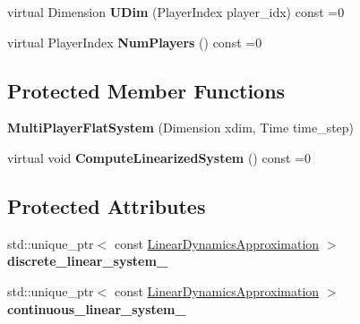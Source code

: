 \begin{DoxyCompactItemize}
\item 
virtual Dimension {\bfseries U\+Dim} (Player\+Index player\+\_\+idx) const =0\hypertarget{classilqgames_1_1_multi_player_flat_system_a1cb3a0636263a35dd2b10f8b203bf29b}{}\label{classilqgames_1_1_multi_player_flat_system_a1cb3a0636263a35dd2b10f8b203bf29b}

\item 
virtual Player\+Index {\bfseries Num\+Players} () const =0\hypertarget{classilqgames_1_1_multi_player_flat_system_a5732cac3a3a64567a3d1b460d787a52d}{}\label{classilqgames_1_1_multi_player_flat_system_a5732cac3a3a64567a3d1b460d787a52d}

\end{DoxyCompactItemize}
\subsection*{Protected Member Functions}
\begin{DoxyCompactItemize}
\item 
{\bfseries Multi\+Player\+Flat\+System} (Dimension xdim, Time time\+\_\+step)\hypertarget{classilqgames_1_1_multi_player_flat_system_a73df802233de8b218744e662ab250b59}{}\label{classilqgames_1_1_multi_player_flat_system_a73df802233de8b218744e662ab250b59}

\item 
virtual void {\bfseries Compute\+Linearized\+System} () const =0\hypertarget{classilqgames_1_1_multi_player_flat_system_ab5e1b8bb3cf07f07c04d7f3884c1c015}{}\label{classilqgames_1_1_multi_player_flat_system_ab5e1b8bb3cf07f07c04d7f3884c1c015}

\end{DoxyCompactItemize}
\subsection*{Protected Attributes}
\begin{DoxyCompactItemize}
\item 
std\+::unique\+\_\+ptr$<$ const \hyperlink{structilqgames_1_1_linear_dynamics_approximation}{Linear\+Dynamics\+Approximation} $>$ {\bfseries discrete\+\_\+linear\+\_\+system\+\_\+}\hypertarget{classilqgames_1_1_multi_player_flat_system_a70c6bbb2e4cd3653594fd650fbcdad94}{}\label{classilqgames_1_1_multi_player_flat_system_a70c6bbb2e4cd3653594fd650fbcdad94}

\item 
std\+::unique\+\_\+ptr$<$ const \hyperlink{structilqgames_1_1_linear_dynamics_approximation}{Linear\+Dynamics\+Approximation} $>$ {\bfseries continuous\+\_\+linear\+\_\+system\+\_\+}\hypertarget{classilqgames_1_1_multi_player_flat_system_ab4961edf0a14f8645c79d2ad39ebd7d6}{}\label{classilqgames_1_1_multi_player_flat_system_ab4961edf0a14f8645c79d2ad39ebd7d6}

\end{DoxyCompactItemize}
